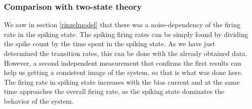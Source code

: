 \documentclass[12pt,a4paper]{article}
\begin{document}
\subsubsection{Comparison with two-state theory}
We saw in section \ref{rinzelmodel} that there was a noise-dependency of the firing rate in the spiking state. The spiking firing rates can be simply found by dividing the spike count by the time spent in the spiking state. As we have just determined the transition rates, this can be done with the already obtained data. However, a second independent measurement that confirms the first results can help us getting a consistent image of the system, so that is what was done here. \\
The firing rate in spiking state increases with the bias current and at the same time approaches the overall firing rate, as the spiking state dominates the behavior of the system. 
\end{document}

